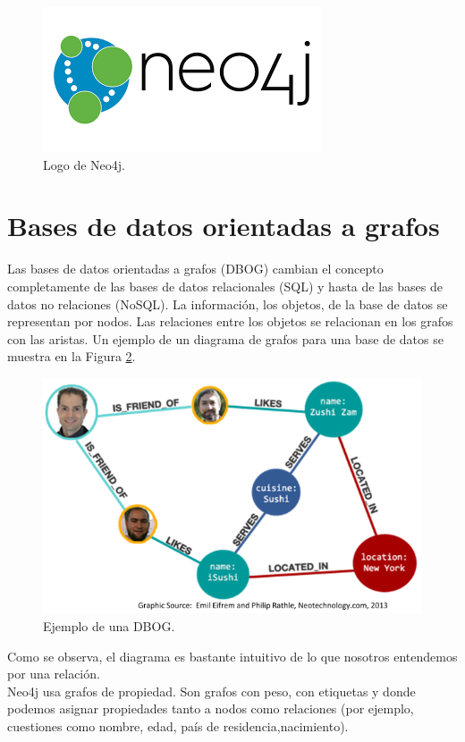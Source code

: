 \documentclass[conference]{IEEEtran}
\begin{document}
\begin{figure}[H]
\begin{center}
\includegraphics[width= 0.45 \textwidth]{neo4j_logo.png}
\end{center}
\caption{Logo de Neo4j.}
\label{fig1}
\end{figure}


\section{Bases de datos orientadas a grafos}

Las bases de datos orientadas a grafos (DBOG) cambian el concepto completamente de las bases de datos relacionales (SQL) y hasta de las bases de datos no relaciones (NoSQL). La información, los objetos, de la base de datos se representan por nodos. Las relaciones entre los objetos se relacionan en los grafos con las aristas. Un ejemplo de un diagrama de grafos para una base de datos se muestra en la Figura \ref{fig2}.

\begin{figure}[H]
\begin{center}
\includegraphics[width= 0.45 \textwidth]{graphDB.png}
\end{center}
\caption{Ejemplo de una DBOG.}
\label{fig2}
\end{figure}

Como se observa, el diagrama es bastante intuitivo de lo que nosotros entendemos por una relación. \\
Neo4j usa grafos de propiedad. Son grafos con peso, con etiquetas y donde podemos asignar propiedades tanto a nodos como relaciones (por
ejemplo, cuestiones como nombre, edad, país de residencia,nacimiento). 
\end{document}
